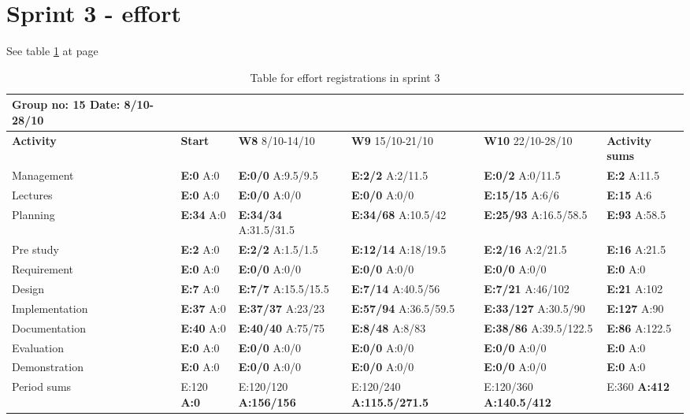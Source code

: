 \section{Sprint 3 - effort}

See table \ref{tab:effortweekss3} at page \pageref{tab:effortweekss3}

\newpage

\begin{table}[htb]
\begin{tabularx}{\linewidth}{>{\setlength\hsize{.625\hsize}}X|>{\setlength\hsize{0.3\hsize}}X|>{\setlength\hsize{0.5\hsize}}X|>{\setlength\hsize{0.5\hsize}}X|>{\setlength\hsize{0.5\hsize}}X|>{\setlength\hsize{.3\hsize}}X}
Group no: 15 Date: 8/10-28/10  \\ \hline
\textbf{Activity} & \textbf{Start} & \textbf{W8} 8/10-14/10 & \textbf{W9} 15/10-21/10 & \textbf{W10} 22/10-28/10 & \textbf{Activity sums} \\ \hline \hline
Management & \textbf{E:0} A:0 & \textbf{E:0/0} A:9.5/9.5 & \textbf{E:2/2} A:2/11.5 & \textbf{E:0/2} A:0/11.5 & \textbf{E:2} A:11.5  \\ \hline
Lectures & \textbf{E:0} A:0 & \textbf{E:0/0} A:0/0 & \textbf{E:0/0} A:0/0 & \textbf{E:15/15} A:6/6 & \textbf{E:15} A:6  \\ \hline
Planning & \textbf{E:34} A:0 & \textbf{E:34/34} A:31.5/31.5 & \textbf{E:34/68} A:10.5/42 & \textbf{E:25/93} A:16.5/58.5 & \textbf{E:93} A:58.5  \\ \hline
Pre study & \textbf{E:2} A:0 & \textbf{E:2/2} A:1.5/1.5 & \textbf{E:12/14} A:18/19.5 & \textbf{E:2/16} A:2/21.5 & \textbf{E:16} A:21.5  \\ \hline
Requirement & \textbf{E:0} A:0 & \textbf{E:0/0} A:0/0 & \textbf{E:0/0} A:0/0 & \textbf{E:0/0} A:0/0 & \textbf{E:0} A:0 \\ \hline
Design & \textbf{E:7} A:0 & \textbf{E:7/7} A:15.5/15.5 & \textbf{E:7/14} A:40.5/56 & \textbf{E:7/21} A:46/102 & \textbf{E:21} A:102  \\ \hline
Implementation & \textbf{E:37} A:0 & \textbf{E:37/37} A:23/23 & \textbf{E:57/94} A:36.5/59.5 & \textbf{E:33/127} A:30.5/90 & \textbf{E:127} A:90  \\ \hline
Documentation & \textbf{E:40} A:0 & \textbf{E:40/40} A:75/75 & \textbf{E:8/48} A:8/83 & \textbf{E:38/86} A:39.5/122.5 & \textbf{E:86} A:122.5  \\ \hline
Evaluation & \textbf{E:0} A:0 & \textbf{E:0/0} A:0/0 & \textbf{E:0/0} A:0/0 & \textbf{E:0/0} A:0/0 & \textbf{E:0 } A:0  \\ \hline
Demonstration & \textbf{E:0} A:0 & \textbf{E:0/0} A:0/0 & \textbf{E:0/0} A:0/0 & \textbf{E:0/0} A:0/0 & \textbf{E:0 } A:0  \\ \hline
Period sums & E:120 \textbf{A:0} & E:120/120 \textbf{A:156/156} & E:120/240 \textbf{A:115.5/271.5} & E:120/360 \textbf{A:140.5/412} & E:360 \textbf{A:412} \\ \hline
\end{tabularx}

\caption{Table for effort registrations in sprint 3} \label{tab:effortweekss3}
\end{table}

